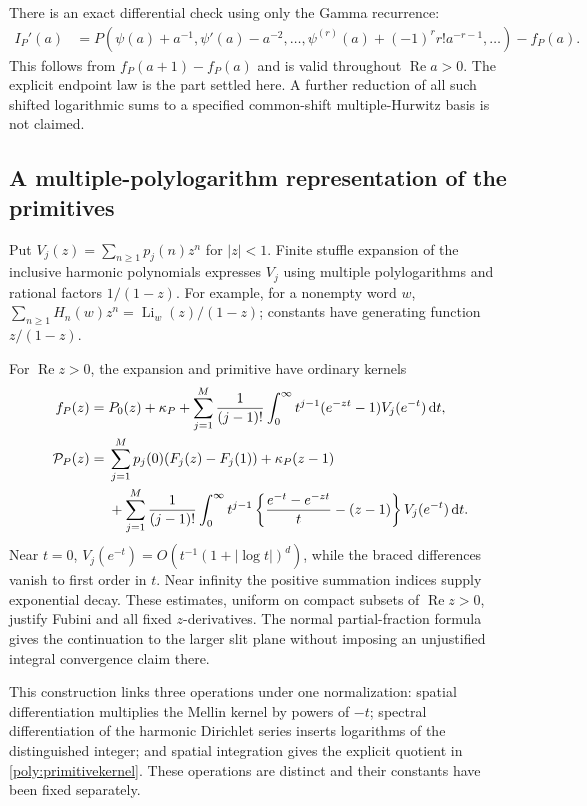 \documentclass[11pt,a4paper]{article}
\numberwithin{equation}{section}
\theoremstyle{definition}
\theoremstyle{remark}
\DeclareMathOperator{\Li}{Li}
\DeclareMathOperator{\re}{Re}
\newcommand{\dd}{\,\mathrm d}
\begin{document}
There is an exact differential check using only the Gamma recurrence:
\begin{align}\label{poly:shiftdifferential}
 I_P'(a)&=P\left(\psi(a)+a^{-1},
 \psi'(a)-a^{-2},\ldots,
 \psi^{(r)}(a)+(-1)^rr!a^{-r-1},\ldots\right)
               -f_P(a).
\end{align}
This follows from $f_P(a+1)-f_P(a)$ and is valid throughout
$\re a>0$. The explicit endpoint law is the part settled here.
A further reduction of all such shifted logarithmic sums to a specified
common-shift multiple-Hurwitz basis is not claimed.

\subsection{A multiple-polylogarithm representation of the primitives}

Put $V_j(z)=\sum_{n\ge1}p_j(n)z^n$ for $|z|<1$. Finite stuffle
expansion of the inclusive harmonic polynomials expresses $V_j$ using
multiple polylogarithms and rational factors $1/(1-z)$.
For example, for a nonempty word $w$,
$\sum_{n\ge1}H_n(w)z^n=\Li_w(z)/(1-z)$; constants have
generating function $z/(1-z)$.

For $\re z>0$, the expansion and primitive have ordinary kernels
\begin{align}\label{poly:MLkernel}
 f_P(z)={}&P_0(z)+\kappa_P+
 \sum_{j=1}^M\frac1{(j-1)!}
 \int_0^\infty t^{j-1}(e^{-zt}-1)V_j(e^{-t})\dd t,\\
 \mathcal P_P(z)={}&\sum_{j=1}^Mp_j(0)(F_j(z)-F_j(1))
 +\kappa_P(z-1)\notag\\
 &+\sum_{j=1}^M\frac1{(j-1)!}
 \int_0^\infty t^{j-1}
 \left\{\frac{e^{-t}-e^{-zt}}t-(z-1)\right\}
 V_j(e^{-t})\dd t.\label{poly:primitivekernel}
\end{align}
Near $t=0$, $V_j(e^{-t})=O(t^{-1}(1+|\log t|)^d)$, while the
braced differences vanish to first order in $t$. Near infinity the
positive summation indices supply exponential decay. These estimates,
uniform on compact subsets of $\re z>0$, justify Fubini and all fixed
$z$-derivatives. The normal partial-fraction formula gives the continuation
to the larger slit plane without imposing an unjustified integral
convergence claim there.

This construction links three operations under one normalization:
spatial differentiation multiplies the Mellin kernel by powers of $-t$;
spectral differentiation of the harmonic Dirichlet series inserts
logarithms of the distinguished integer; and spatial integration gives
the explicit quotient in \eqref{poly:primitivekernel}. These operations
are distinct and their constants have been fixed separately.
\end{document}
